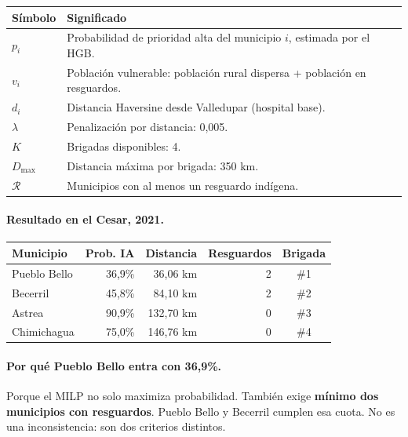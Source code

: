 \documentclass[11pt,a4paper]{article}
\begin{document}
\begin{table}[H]
\centering
\small
\begin{tabularx}{\textwidth}{@{}L{3.2cm} Y@{}}
\toprule
\textbf{Símbolo} & \textbf{Significado} \\
\midrule
$p_i$ & Probabilidad de prioridad alta del municipio $i$, estimada por el HGB. \\
$v_i$ & Población vulnerable: población rural dispersa + población en resguardos. \\
$d_i$ & Distancia Haversine desde Valledupar (hospital base). \\
$\lambda$ & Penalización por distancia: 0,005. \\
$K$ & Brigadas disponibles: 4. \\
$D_{\max}$ & Distancia máxima por brigada: 350 km. \\
$\mathcal{R}$ & Municipios con al menos un resguardo indígena. \\
\bottomrule
\end{tabularx}
\end{table}

\paragraph{Resultado en el Cesar, 2021.}

\begin{table}[H]
\centering
\small
\begin{tabular}{@{}l r r r c@{}}
\toprule
\textbf{Municipio} & \textbf{Prob. IA} & \textbf{Distancia} & \textbf{Resguardos} & \textbf{Brigada} \\
\midrule
Pueblo Bello & 36,9\% & 36,06 km & 2 & \#1 \\
Becerril & 45,8\% & 84,10 km & 2 & \#2 \\
Astrea & 90,9\% & 132,70 km & 0 & \#3 \\
Chimichagua & 75,0\% & 146,76 km & 0 & \#4 \\
\bottomrule
\end{tabular}
\end{table}

\paragraph{Por qué Pueblo Bello entra con 36,9\%.}
Porque el MILP no solo maximiza probabilidad. También exige \textbf{mínimo dos municipios con resguardos}. Pueblo Bello y Becerril cumplen esa cuota. No es una inconsistencia: son dos criterios distintos.
\end{document}
